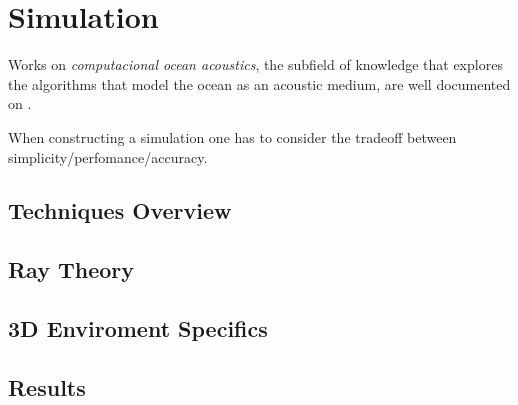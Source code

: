 \section{Simulation}

Works on \textit{computacional ocean
acoustics}, the subfield of knowledge that explores the algorithms that model
the ocean as an acoustic medium, are well documented on
\cite{Etter2013}.

When constructing a simulation one has to consider the tradeoff between
simplicity/perfomance/accuracy.

\subsection{Techniques Overview}
\subsection{Ray Theory}
\subsection{3D Enviroment Specifics}
\subsection{Results}

